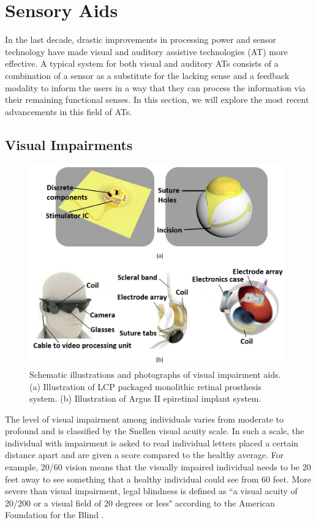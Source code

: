\section{Sensory Aids}
In the last decade, drastic improvements in processing power and sensor technology have made visual and auditory assistive technologies (AT) more effective. A typical system for both visual and auditory ATs consists of a combination of a sensor as a substitute for the lacking sense and a feedback modality to inform the users in a way that they can process the information via their remaining functional senses. In this section, we will explore the most recent advancements in this field of ATs. 

\subsection{Visual Impairments}
\begin{figure}[h!]
    \centering
    \includegraphics[width=110mm]{Figure/SensoryAid/VICollage}
    \caption{Schematic illustrations and photographs of visual impairment aids. (a) Illustration of LCP packaged monolithic retinal prosthesis system. (b) Illustration of Argus II epiretinal implant system.}
    \label{fig:VICollage}
\end{figure}

The level of visual impairment among individuals varies from moderate to profound and is classified by the Snellen visual acuity scale. In such a scale, the individual with impairment is asked to read individual letters placed a certain distance apart and are given a score compared to the healthy average. For example, 20/60 vision means that the visually impaired individual needs to be 20 feet away to see something that a healthy individual could see from 60 feet. More severe than visual impairment, legal blindness is defined as ``a visual acuity of 20/200 or a visual field of 20 degrees or less" according to the American Foundation for the Blind \parencite{AFB}. 

